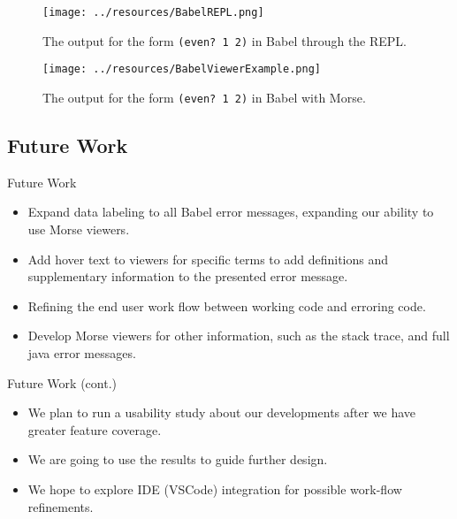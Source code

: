 \documentclass{beamer}
\begin{document}
\begin{frame}
  \begin{figure}
    \centering
    \texttt{[image: ../resources/BabelREPL.png]}
    \caption{The output for the form \texttt{(even? 1 2)} in Babel through the REPL.}
    \label{fig:BabelREPL}
  \end{figure}
\end{frame}

\begin{frame}
  \begin{figure}
    \centering
    \texttt{[image: ../resources/BabelViewerExample.png]}
    \caption{The output for the form \texttt{(even? 1 2)} in Babel with Morse.}
    \label{fig:defaultclj}
  \end{figure}
\end{frame}

\subsection{Future Work}
\begin{frame}{Future Work}
  \begin{itemize}
    \item<1-> Expand data labeling to all Babel error messages, expanding our ability to use Morse viewers.
    \item<2-> Add hover text to viewers for specific terms to add definitions and supplementary information to the presented error message.
    \item<3-> Refining the end user work flow between working code and erroring code.
    \item<4-> Develop Morse viewers for other information, such as the stack trace, and full java error messages.
  \end{itemize}
  \end{frame}

\begin{frame}{Future Work (cont.)}
  \begin{itemize}
    \item<1-> We plan to run a usability study about our developments after we have greater feature coverage.
    \item<2-> We are going to use the results to guide further design.
    \item<3-> We hope to explore IDE (VSCode) integration for possible work-flow refinements.
  \end{itemize}
\end{frame}
\end{document}

